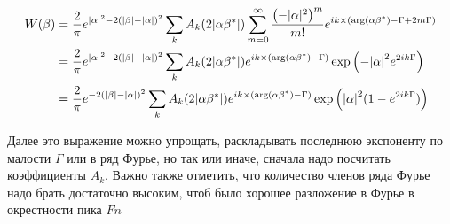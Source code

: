 \documentclass[a4paper, 12pt]{article}
\newenvironment{eqw}{\begin{equation} \begin{aligned}}   
    {\end{aligned}    \end{equation}}
\begin{document}
\begin{eqw}
    W(\beta) &= \frac{2}{\pi}e^{\abs{\alpha}^2-2\left(\abs{\beta} - \abs{\alpha}\right)^2}
    \sum\limits_k A_k(2\abs{\alpha\beta^*})
    \sum\limits_{m=0}^{\infty} \frac{\left(-|\alpha|^2\right)^m}{m!}e^{ik\times\left(\arg(\alpha\beta^*) -\Gamma + 2m\Gamma\right)}\\
    &= \frac{2}{\pi}e^{\abs{\alpha}^2-2\left(\abs{\beta} - \abs{\alpha}\right)^2}
    \sum\limits_k A_k(2\abs{\alpha\beta^*})e^{ik\times\left(\arg(\alpha\beta^*) -\Gamma\right)}
    \exp\left(-\abs{\alpha}^2 e^{2ik\Gamma}\right)\\
    &= \frac{2}{\pi}e^{-2\left(\abs{\beta} - \abs{\alpha}\right)^2}
    \sum\limits_k A_k(2\abs{\alpha\beta^*})e^{ik\times\left(\arg(\alpha\beta^*) -\Gamma\right)}
    \exp\left(\abs{\alpha}^2 (1-e^{2ik\Gamma})\right)
\end{eqw}

Далее это выражение можно упрощать, раскладывать последнюю экспоненту по малости $\Gamma$ или в ряд Фурье, но так или иначе, сначала надо посчитать коэффициенты $A_k$. Важно также отметить, что количество членов ряда Фурье надо брать достаточно высоким, чтоб было хорошее разложение в Фурье в окрестности пика $Fn$
\end{document}
